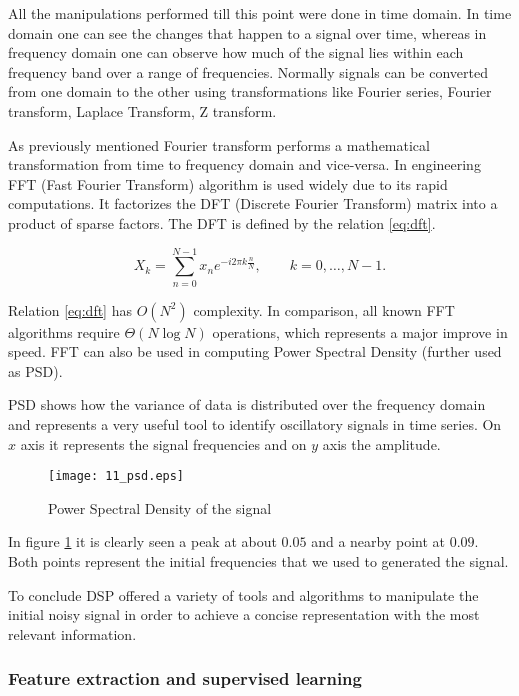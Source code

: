 All the manipulations performed till this point were done in time domain. In time domain one can see the changes that happen to a signal over time, whereas in frequency domain one can observe how much of the signal lies within each frequency band over a range of frequencies. Normally signals can be converted from one domain to the other using transformations like Fourier series, Fourier transform, Laplace Transform, Z transform. 

As previously mentioned Fourier transform performs a mathematical transformation from time to frequency domain and vice-versa. In engineering FFT (Fast Fourier Transform) algorithm is used widely due to its rapid computations. It factorizes the DFT (Discrete Fourier Transform) matrix into a product of sparse factors.  The DFT is defined by the relation \eqref{eq:dft}.

\begin{equation} \label{eq:dft}
 X_k = \sum_{n=0}^{N-1} x_n e^{-i2\pi k\frac{n}{N}}, \qquad k= 0,\ldots , N-1.
\end{equation}

Relation \eqref{eq:dft} has $O(N^2)$ complexity. In comparison, all known FFT algorithms require $\Theta (N \log N)$ operations, which represents a major improve in speed. FFT can also be used in computing Power Spectral Density (further used as PSD).

PSD shows how the variance of data is distributed over the frequency domain and represents a very useful tool to identify oscillatory signals in time series. On $x$ axis it represents the signal frequencies and on $y$ axis the amplitude. 

\begin{figure}[!ht]
\centering
  \texttt{[image: 11\_psd.eps]}
\caption{Power Spectral Density of the signal}
\label{fig:psd}
\end{figure}

In figure \ref{fig:psd} it is clearly seen a peak at about $0.05$ and a nearby point at $0.09$. Both points represent the initial frequencies that we used to generated the signal. 

To conclude DSP offered a variety of tools and algorithms to manipulate the initial noisy signal in order to achieve a concise representation with the most relevant information.

\subsubsection{Feature extraction and supervised learning}

\clearpage


